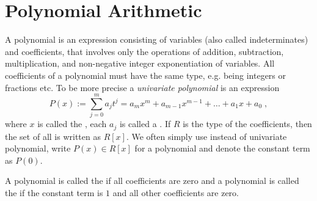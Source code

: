 \section{Polynomial Arithmetic}
A polynomial is an expression consisting of variables (also called indeterminates) and coefficients, that involves only the operations of addition, subtraction, multiplication, and non-negative integer exponentiation of variables. All coefficients of a polynomial must have the same type, e.g. being integers or fractions etc. To be more precise a \textit{univariate polynomial} is an expression
\begin{equation}
P(x) := \sum _{j = 0} ^{m}{a} _{j}{t} ^{j} ={a} _{m}x^m +{a} _{m-1} x^{m-1} + \dots + a_1 x + a_0 \;,
\end{equation}
where $x$ is called the , each $ a_j$ is called a . If $R$ is the type of the coefficients, then the set of all  is written as $R[x]$. We often simply use  instead of univariate polynomial, write $ P (x) \in R[x]$ for a polynomial and denote the constant term as $ P(0)$. 

A polynomial is called the  if all coefficients are zero and a polynomial is called the  if the constant term is $1$ and all other coefficients are zero.

